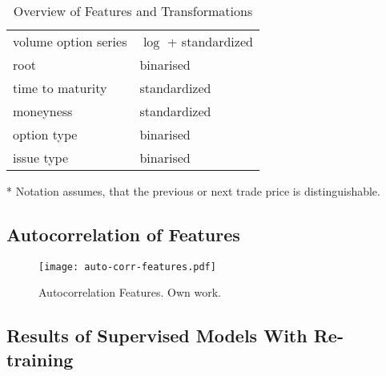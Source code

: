 \begin{table}[H]
\begin{threeparttable}
\begin{tabular}{@{}ll@{}}
            volume option series    & $\log$ + standardized  \\
            root                    & binarised              \\
            time to maturity        & standardized           \\
            moneyness               & standardized           \\
            option type             & binarised              \\
            issue type              & binarised              \\ \bottomrule
        \end{tabular}
        \begin{tablenotes}\footnotesize
            \item[*] Notation assumes, that the previous or next trade price is distinguishable.
        \end{tablenotes}
    \end{threeparttable}
    \caption[Overview of Features and Transformations]{Overview of Features and Transformations}
    \label{tab:features-transformations}
\end{table}

\newpage
\subsection{Autocorrelation of Features}
\label{app:autocorrelation-of-features}

\begin{figure}[ht]
    \centering
    \texttt{[image: auto-corr-features.pdf]}
    \caption[Autocorrelation of Features]{Autocorrelation Features. Own work.}
    \label{fig:auto-correlation-features}
\end{figure}

\newpage
\subsection{Results of Supervised Models With Re-training}
\label{app:results-of-supervised-models-with-re-training}

